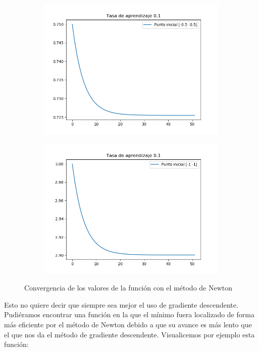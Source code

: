\documentclass[12pt,a4paper]{article}
\begin{document}
\begin{figure}[H]
\begin{subfigure}{0.24\textwidth}
		\includegraphics[scale=0.3]{./Imagenes/bonus10.png}
	\end{subfigure}
	\begin{subfigure}{0.24\textwidth}
		\centering
		\includegraphics[scale=0.3]{./Imagenes/bonus11.png}
	\end{subfigure}
	\caption{Convergencia de los valores de la función con el método de Newton}
	\label{convergenciaNewton2}
\end{figure}

Esto no quiere decir que siempre sea mejor el uso de gradiente descendente. Pudiéramos encontrar una función en la que el mínimo fuera localizado de forma más eficiente por el método de Newton debido a que su avance es más lento que el que nos da el método de gradiente descendente. Visualicemos por ejemplo esta función:
\end{document}
